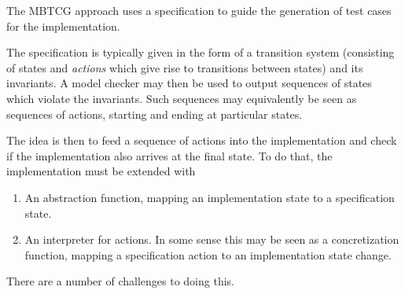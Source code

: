 \documentclass[a4paper]{article}
\begin{document}
The MBTCG approach uses a specification to guide the generation of test cases for the implementation.

The specification is typically given in the form of a transition system (consisting of states and \emph{actions} which give rise to transitions between states) and its invariants. A model checker may then be used to output sequences of states which violate the invariants. Such sequences may equivalently be seen as sequences of actions, starting and ending at particular states.

The idea is then to feed a sequence of actions into the implementation and check if the implementation also arrives at the final state. To do that, the implementation must be extended with

\begin{enumerate}
\item An abstraction function, mapping an implementation state to a specification state.
\item An interpreter for actions. In some sense this may be seen as a concretization function, mapping a specification action to an implementation state change.
\end{enumerate}

There are a number of challenges to doing this.
\end{document}
